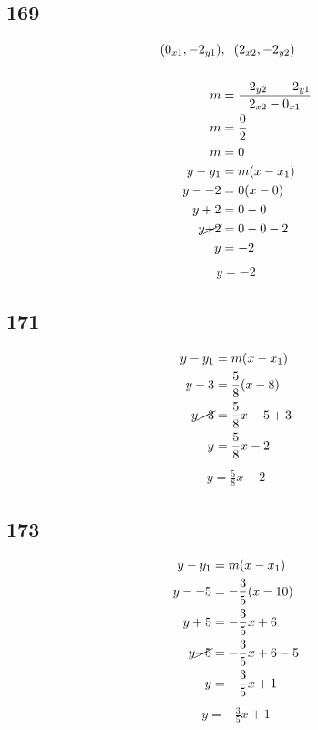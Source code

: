 \documentclass{article}
\begin{document}
    \subsection*{169}
    \begin{align*}
    (0_{x1}, -2_{y1})&,\hspace{.2cm} (2_{x2}, -2_{y2}) \\
    \\
    m &= \frac{-2_{y2} -  -2_{y1}}{2_{x2} - 0_{x1}} \\
    m &= \frac{0}{2} \\
    m &= 0\\
    y - y_{1} &= m(x - x_{1})\\
    y - -2 &= 0(x - 0) \\
    y + 2 &= 0 - 0\\
    y \cancel{+2} &= 0 - 0 - 2\\
    y &=- 2
    \end{align*}
    \begin{align*}
        \boxed{y = -2}
    \end{align*}

    \subsection*{171}
    \begin{align*}
    y - y_{1} &= m(x - x_{1})\\
    y - 3 &= \frac{5}{8}(x - 8) \\
    y \cancel{-3} &= \frac{5}{8}x - 5 +3\\
    y &= \frac{5}{8}x - 2
    \end{align*}
    \begin{align*}
        \boxed{y = \frac{5}{8}x - 2}
    \end{align*}

    \subsection*{173}
    \begin{align*}
        y - y_{1} &= m(x - x_{1})\\
        y - -5 &= -\frac{3}{5}(x - 10) \\
        y + 5 &= -\frac{3}{5}x + 6\\
        y \cancel{+5} &= -\frac{3}{5}x + 6 -5\\
        y &= -\frac{3}{5}x +1
    \end{align*}
    \begin{align*}
        \boxed{y = -\frac{3}{5}x +1}
    \end{align*}
\end{document}
